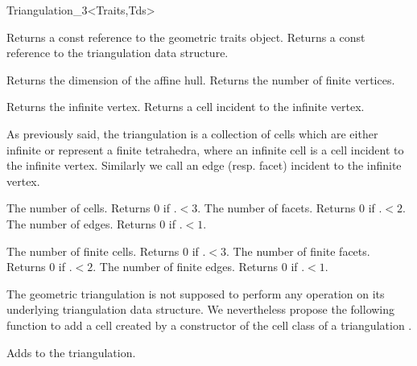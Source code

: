 \begin{ccClassTemplate}{Triangulation_3<Traits,Tds>}
\ccAccessFunctions
{}

{Returns a const reference to the geometric traits object.}
\ccGlue
{}
{Returns a const reference to the triangulation data structure.}

{Returns the dimension of the affine hull.}
\ccGlue
{}
{Returns the number of finite vertices.}

{Returns the infinite vertex.}
\ccGlue
{}
{Returns a cell incident to the infinite vertex.}


As previously said, the triangulation is a collection of cells which
are either infinite or represent a finite tetrahedra, where an
infinite cell is a 
cell incident to the infinite vertex. Similarly we call 
an edge (resp. facet) incident to the infinite vertex.

{The number of cells. Returns 0 if \ccVar.$<3$.}
\ccGlue
{}
{The number of facets. Returns 0 if \ccVar.$<2$.}
\ccGlue
{}
{The number of edges. Returns 0 if \ccVar.$<1$.}

{The number of finite cells. Returns 0 if \ccVar.$<3$.}
\ccGlue
{}
{The number of finite facets. Returns 0 if \ccVar.$<2$.}
\ccGlue
{}
{The number of finite edges. Returns 0 if \ccVar.$<1$.}

\begin{ccAdvanced}

\ccModifiers
The geometric triangulation is not supposed to perform any operation
on its underlying triangulation data structure. We nevertheless
propose the following function to add a cell created by a constructor
of the cell class of a triangulation
.

{Adds  to the triangulation.
}
\end{ccAdvanced}


\end{ccClassTemplate}
